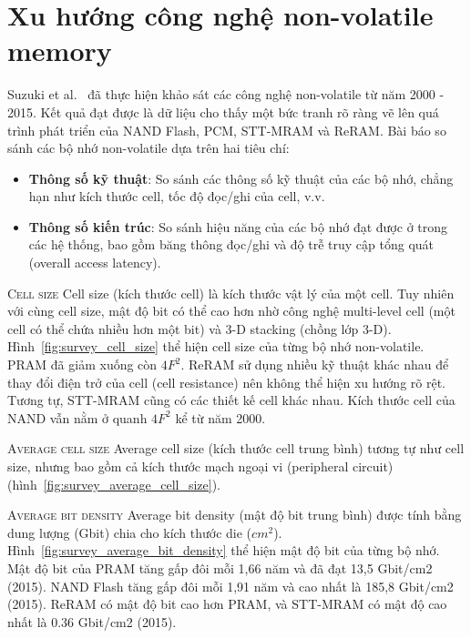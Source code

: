\section{Xu hướng công nghệ non-volatile memory}
\label{chap:experiments}

Suzuki et al.~\cite{suzukiSurveyTrendsNonVolatile2015a} đã thực hiện khảo sát
các công nghệ non-volatile từ năm 2000 - 2015. Kết quả đạt được là dữ liệu cho
thấy một bức tranh rõ ràng vẽ lên quá trình phát triển của NAND Flash, PCM,
STT-MRAM và ReRAM. Bài báo so sánh các bộ nhớ non-volatile dựa trên hai tiêu
chí:

\begin{itemize}
    \item \textbf{Thông số kỹ thuật}: So sánh các thông số kỹ thuật của các bộ
    nhớ, chẳng hạn như kích thước cell, tốc độ đọc/ghi của cell, v.v.

    \item \textbf{Thông số kiến trúc}: So sánh hiệu năng của các bộ nhớ đạt
    được ở trong các hệ thống, bao gồm băng thông đọc/ghi và độ trễ truy cập
    tổng quát (overall access latency).
\end{itemize}

\textsc{Cell size} \hspace{0.5cm} Cell size (kích thước cell) là kích thước vật
lý của một cell. Tuy nhiên với cùng cell size, mật độ bit có thể cao hơn nhờ
công nghệ multi-level cell (một cell có thể chứa nhiều hơn một bit) và 3-D
stacking (chồng lớp 3-D). Hình~\ref{fig:survey_cell_size} thể hiện cell size
của từng bộ nhớ non-volatile. PRAM đã giảm xuống còn $4F^2$. ReRAM sử dụng
nhiều kỹ thuật khác nhau để thay đổi điện trở của cell (cell resistance) nên
không thể hiện xu hướng rõ rệt. Tương tự, STT-MRAM cũng có các thiết kế cell
khác nhau. Kích thước cell của NAND vẫn nằm ở quanh $4F^2$ kể từ năm 2000.


\textsc{Average cell size} \hspace{0.5cm} Average cell size (kích thước cell
trung bình) tương tự như cell size, nhưng bao gồm cả kích thước mạch ngoại vi
(peripheral circuit) (hình~\ref{fig:survey_average_cell_size}).


\textsc{Average bit density} \hspace{0.5cm} Average bit density (mật độ bit
trung bình) được tính bằng dung lượng (Gbit) chia cho kích thước die ($cm^2$).
Hình~\ref{fig:survey_average_bit_density} thể hiện mật độ bit của từng bộ nhớ.
Mật độ bit của PRAM tăng gấp đôi mỗi 1,66 năm và đã đạt 13,5 Gbit/cm2 (2015).
NAND Flash tăng gấp đôi mỗi 1,91 năm và cao nhất là 185,8 Gbit/cm2 (2015).
ReRAM có mật độ bit cao hơn PRAM, và STT-MRAM có mật độ cao nhất là 0.36
Gbit/cm2 (2015).

